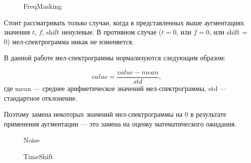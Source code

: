 \documentclass[12pt, fleqn]{article}
\begin{document}
\begin{figure}[ht!]
		\caption{FreqMasking}
		\label{fig:i6}
\end{figure}

Стоит рассматривать только случаи, когда в представленных выше аугментациях значения $t$, $f$, shift ненулевые. В противном случае ($t = 0$, или $f = 0$, или shift = 0) мел-спектрограмма никак не изменяется.

В данной работе мел-спектрограммы нормализуются следующим образом: 

$$value = \frac{value - mean}{std},$$ где mean --- среднее арифметическое значений мел-спектрограммы, std --- стандартное отклонение. 

Поэтому замена некоторых значений мел-спектрограммы на 0 в результате применения аугментации --- это замена на оценку математического ожидания.

\begin{figure}[ht!]
		\caption{Noise}
		\label{fig:i7}
\end{figure}

\begin{figure}[ht!]
		\caption{TimeShift}
		\label{fig:i8}
\end{figure}
\end{document}
